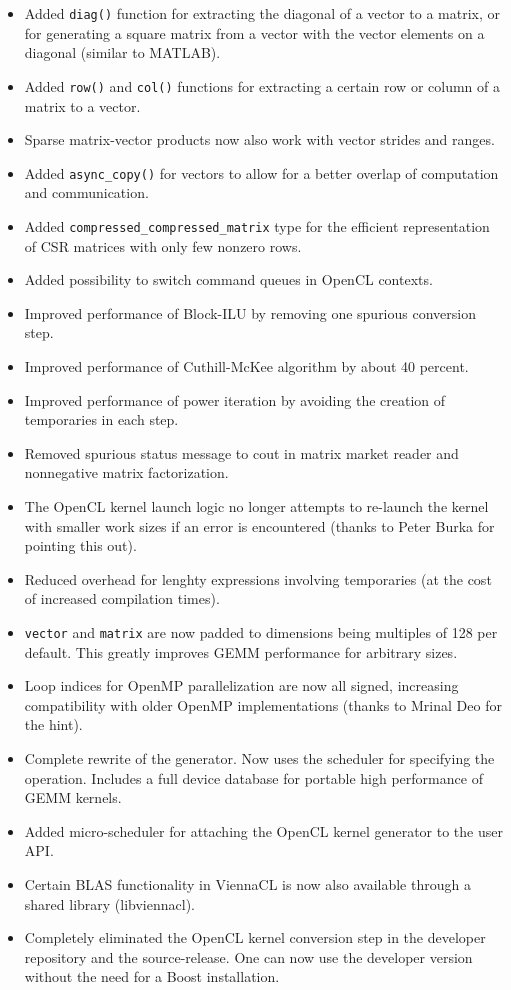 \begin{itemize}
 \item Added \lstinline|diag()| function for extracting the diagonal of a vector to a matrix, or for generating a square matrix from a vector with the vector elements on a diagonal (similar to MATLAB).
 \item Added \lstinline|row()| and \lstinline|col()| functions for extracting a certain row or column of a matrix to a vector.
 \item Sparse matrix-vector products now also work with vector strides and ranges.
 \item Added \lstinline|async_copy()| for vectors to allow for a better overlap of computation and communication.
 \item Added \lstinline|compressed_compressed_matrix| type for the efficient representation of CSR matrices with only few nonzero rows.
 \item Added possibility to switch command queues in OpenCL contexts.
 \item Improved performance of Block-ILU by removing one spurious conversion step.
 \item Improved performance of Cuthill-McKee algorithm by about 40 percent.
 \item Improved performance of power iteration by avoiding the creation of temporaries in each step.
 \item Removed spurious status message to cout in matrix market reader and nonnegative matrix factorization.
 \item The OpenCL kernel launch logic no longer attempts to re-launch the kernel with smaller work sizes if an error is encountered (thanks to Peter Burka for pointing this out).
 \item Reduced overhead for lenghty expressions involving temporaries (at the cost of increased compilation times).
 \item \lstinline|vector| and \lstinline|matrix| are now padded to dimensions being multiples of 128 per default. This greatly improves GEMM performance for arbitrary sizes.
 \item Loop indices for OpenMP parallelization are now all signed, increasing compatibility with older OpenMP implementations (thanks to Mrinal Deo for the hint).
 \item Complete rewrite of the generator. Now uses the scheduler for specifying the operation. Includes a full device database for portable high performance of GEMM kernels.
 \item Added micro-scheduler for attaching the OpenCL kernel generator to the user API.
 \item Certain BLAS functionality in ViennaCL is now also available through a shared library (libviennacl).
 \item Completely eliminated the OpenCL kernel conversion step in the developer repository and the source-release. One can now use the developer version without the need for a Boost installation.
\end{itemize}


